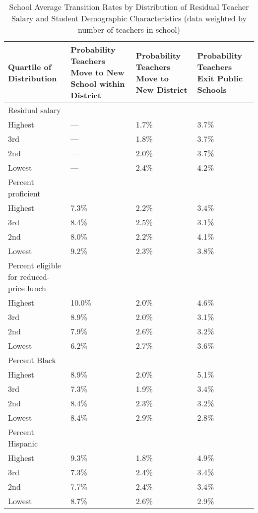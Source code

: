 \documentclass[]{article}
\begin{document}
\begin{table}[ht]
\centering
\begin{tabular}{p{}p{}p{}p{}}
  \hline
Quartile of Distribution & Probability Teachers Move to New School within District & Probability Teachers Move to New District & Probability Teachers Exit Public Schools \\ 
  \hline
Residual salary & & & \\
\quad Highest & --- & 1.7\% & 3.7\% \\ 
  \quad 3rd & --- & 1.8\% & 3.7\% \\ 
  \quad 2nd & --- & 2.0\% & 3.7\% \\ 
  \quad Lowest & --- & 2.4\% & 4.2\% \\ 
Percent proficient & & & \\
  \quad Highest & 7.3\% & 2.2\% & 3.4\% \\ 
  \quad 3rd & 8.4\% & 2.5\% & 3.1\% \\ 
  \quad 2nd & 8.0\% & 2.2\% & 4.1\% \\ 
  \quad Lowest & 9.2\% & 2.3\% & 3.8\% \\ 
Percent eligible for reduced-price lunch & & & \\
  \quad Highest & 10.0\% & 2.0\% & 4.6\% \\ 
  \quad 3rd & 8.9\% & 2.0\% & 3.1\% \\ 
  \quad 2nd & 7.9\% & 2.6\% & 3.2\% \\ 
  \quad Lowest & 6.2\% & 2.7\% & 3.6\% \\ 
Percent Black & & & \\
  \quad Highest & 8.9\% & 2.0\% & 5.1\% \\ 
  \quad 3rd & 7.3\% & 1.9\% & 3.4\% \\ 
  \quad 2nd & 8.4\% & 2.3\% & 3.2\% \\ 
  \quad Lowest & 8.4\% & 2.9\% & 2.8\% \\ 
Percent Hispanic & & & \\
  \quad Highest & 9.3\% & 1.8\% & 4.9\% \\ 
  \quad 3rd & 7.3\% & 2.4\% & 3.4\% \\ 
  \quad 2nd & 7.7\% & 2.4\% & 3.4\% \\ 
  \quad Lowest & 8.7\% & 2.6\% & 2.9\% \\ 
   \hline
\end{tabular}
\caption{School Average Transition Rates by Distribution of Residual Teacher Salary and Student Demographic Characteristics (data weighted by number of teachers in school)} 
\label{tbl:change_by_quartile}
\end{table}
\end{document}
